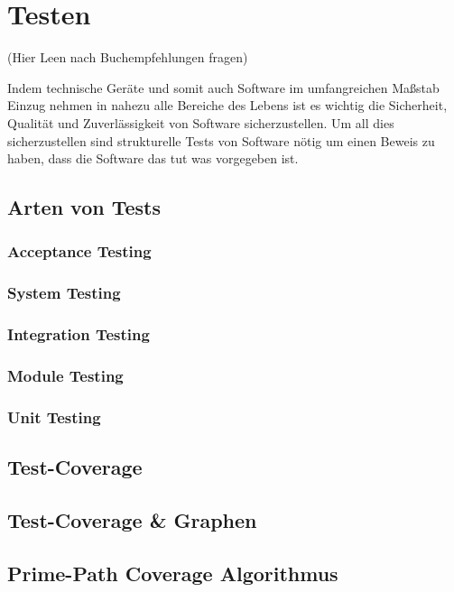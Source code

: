 \section{Testen}

(Hier Leen nach Buchempfehlungen fragen)

Indem technische Geräte und somit auch Software im umfangreichen Maßstab Einzug nehmen in nahezu alle Bereiche des
Lebens ist es wichtig die Sicherheit, Qualität und Zuverlässigkeit von Software sicherzustellen.
Um all dies sicherzustellen sind strukturelle Tests von Software nötig um einen Beweis zu haben, dass die Software
das tut was vorgegeben ist.

\subsection{Arten von Tests }

\subsubsection{Acceptance Testing}

\subsubsection{System Testing}

\subsubsection{Integration Testing}

\subsubsection{Module Testing}

\subsubsection{Unit Testing}

\subsection{Test-Coverage}

\subsection{Test-Coverage & Graphen}

\subsection{Prime-Path Coverage Algorithmus}

